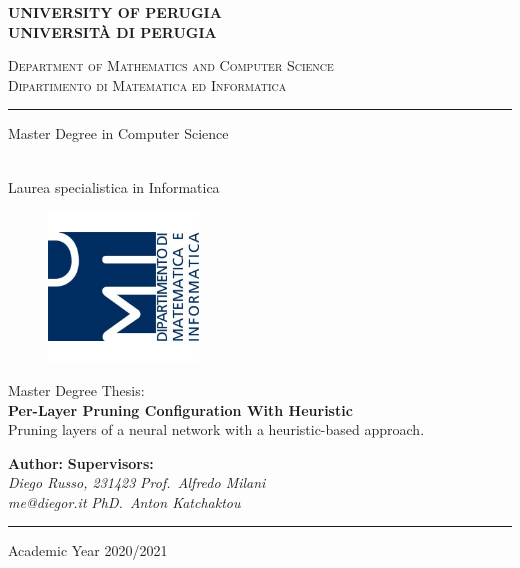 \begin{titlepage}
    \begin{center}
        \textbf{\Large UNIVERSITY OF PERUGIA}\\
        \textbf{UNIVERSITÀ DI PERUGIA}
        \vspace{0.5cm}

        \scshape{Department of Mathematics and Computer Science}\\
        \scshape{Dipartimento di Matematica ed Informatica}

        \rule[1mm]{\textwidth}{0.2mm}
        \vspace{0.5cm}

        \begin{Large}Master Degree in Computer Science\end{Large}\\
        Laurea specialistica in Informatica
        \vspace{0.5cm}

        \begin{figure}[htbp]
            \begin{center}
                
                \includegraphics[width=4cm]{images/dmi_logo.png}
            \end{center}
        \end{figure}

        Master Degree Thesis:\\
        \vspace{0.5cm}
        \textbf{\LARGE Per-Layer Pruning Configuration With Heuristic}\\
        \vspace{0.3cm}
        Pruning layers of a neural network with a heuristic-based approach.\\
        \vspace{2cm}

        \textbf{Author:} \hfill \textbf{Supervisors:}\\
        \textit{Diego Russo, 231423} \hfill \textit{Prof.\ Alfredo Milani}\\
        \textit{me@diegor.it} \hfill \textit{PhD.\ Anton Katchaktou}

        \rule[1mm]{\textwidth}{0.2mm}
        \small{Academic Year 2020/2021}
    \end{center}
\end{titlepage}